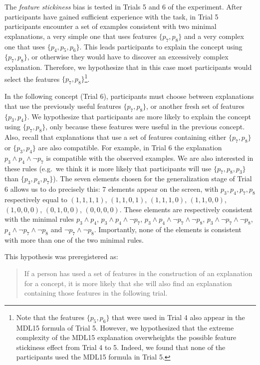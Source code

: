 \begin{hyp}\label{Hip:FeatureBiasStickiness}

    The \textit{feature stickiness} bias is tested in Trials 5 and 6 of the experiment. After participants have gained sufficient experience with the task, in Trial 5 participants encounter a set of examples consistent with two minimal explanations, a very simple one that uses features $\{p_7, p_8\}$ and a very complex one that uses $\{p_4,p_5,p_6\}$. This leads participants to explain the concept using $\{p_7, p_8\}$, or otherwise they would have to discover an excessively complex explanation. Therefore, we hypothesize that in this case most participants would select the features $\{p_7, p_8\}$\footnote{Note that the features $\{p_5,p_6\}$ that were used in Trial 4 also appear in the MDL15 formula of Trial 5. However, we hypothesized that the extreme complexity of the MDL15 explanation overwheights the possible feature stickiness effect from Trial 4 to 5. Indeed, we found that none of the participants used the MDL15 formula in Trial 5.}. 
    
        In the following concept (Trial 6), participants must choose between explanations that use the previously useful features $\{p_7, p_8\}$, or another fresh set of features $\{p_3, p_4\}$. We hypothesize that participants are more likely to explain the concept using $\{p_7, p_8\}$, only because these features were useful in the previous concept. Also, recall that explanations that use a set of features containing either $\{p_7, p_8\}$ or $\{p_3, p_4\}$ are also compatible. For example, in Trial 6 the explanation $p_3 \land p_4 \land \lnot p_7$ is compatible with the observed examples. We are also interested in these rules (e.g.\ we think it is more likely that participants will use $\{p_7, p_8, p_3\}$ than $\{p_3, p_4, p_7\}$). The seven elements chosen for the generalization stage of Trial 6 allows us to do precisely this: 7 elements appear on the screen, with $p_3, p_4, p_7, p_8$ respectively equal to $(1, 1, 1, 1)$, $(1, 1, 0, 1)$, $(1, 1, 1, 0)$, $(1, 1, 0, 0)$, $(1, 0, 0, 0)$, $(0, 1, 0, 0)$, $(0, 0, 0, 0)$. These elements are respectively consistent with the minimal rules $p_3 \land p_4$, $p_3 \land p_4 \land \lnot p_7$, $p_3 \land p_4 \land \lnot p_7 \land \lnot p_8$, $p_3 \land \lnot p_7 \land \lnot p_8$, $p_4 \land \lnot p_7 \land \lnot p_8$ and  $\lnot p_7 \land \lnot p_8$. Importantly, none of the elements is consistent with more than one of the two minimal rules.

This hypothesis was preregistered as:
\begin{quote}
If a person has used a set of features in the construction of an explanation for a concept, it is more likely that she will also find an explanation containing those features in the following trial. 
\end{quote}
    
\end{hyp}


